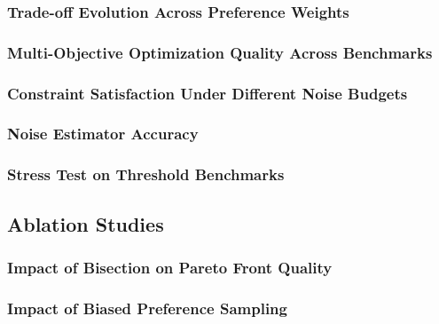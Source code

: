 \subsubsection{Trade-off Evolution Across Preference Weights
\label{sec:evaluation:tradeoff-evolution}}



\subsubsection{Multi-Objective Optimization Quality Across Benchmarks
\label{sec:evaluation:mo-quality}}




\subsubsection{Constraint Satisfaction Under Different Noise Budgets
\label{sec:evaluation:constraint-satisfaction}}



\subsubsection{Noise Estimator Accuracy
\label{sec:evaluation:noise-estimator}}



\subsubsection{Stress Test on Threshold Benchmarks
\label{sec:evaluation:stress-test}}





\subsection{Ablation Studies
\label{sec:evaluation:ablations}}

\subsubsection{Impact of Bisection on Pareto Front Quality
\label{sec:evaluation:ablation-bisection}}




\subsubsection{Impact of Biased Preference Sampling
\label{sec:evaluation:ablation-biased-sampling}}



